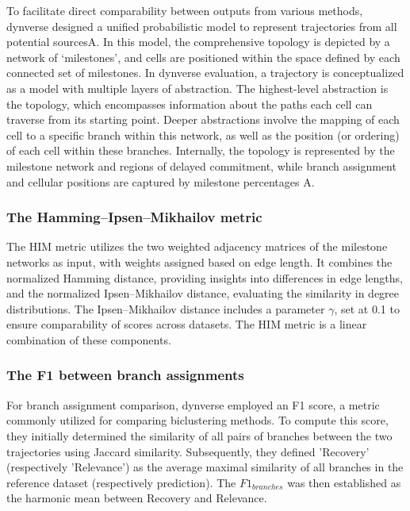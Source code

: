 To facilitate direct comparability between outputs from various methods, dynverse\citep{Saelens2019} designed a unified probabilistic model to represent trajectories from all potential sourcesA. In this model, the comprehensive topology is depicted by a network of `milestones', and cells are positioned within the space defined by each connected set of milestones. In dynverse evaluation, a trajectory is conceptualized as a model with multiple layers of abstraction. The highest-level abstraction is the topology, which encompasses information about the paths each cell can traverse from its starting point. Deeper abstractions involve the mapping of each cell to a specific branch within this network, as well as the position (or ordering) of each cell within these branches. Internally, the topology is represented by the milestone network and regions of delayed commitment, while branch assignment and cellular positions are captured by milestone percentages A.


\subsubsection{The Hamming–Ipsen–Mikhailov metric}
The HIM metric utilizes the two weighted adjacency matrices of the milestone networks as input, with weights assigned based on edge length. It combines the normalized Hamming distance, providing insights into differences in edge lengths, and the normalized Ipsen–Mikhailov distance, evaluating the similarity in degree distributions. The Ipsen–Mikhailov distance includes a parameter $\gamma$, set at 0.1 to ensure comparability of scores across datasets. The HIM metric is a linear combination of these components.

\subsubsection{The F1 between branch assignments}
For branch assignment comparison, dynverse employed an F1 score, a metric commonly utilized for comparing biclustering methods. To compute this score, they initially determined the similarity of all pairs of branches between the two trajectories using Jaccard similarity. Subsequently, they defined 'Recovery' (respectively 'Relevance') as the average maximal similarity of all branches in the reference dataset (respectively prediction). The $F1_{branches}$ was then established as the harmonic mean between Recovery and Relevance.

